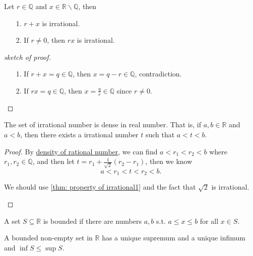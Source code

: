 \begin{theorem} \label{thm: property of irrational1}
    Let \(r \in \mathbb{Q} \) and \(x \in \mathbb{R} \backslash \mathbb{Q} \), then 
    \begin{itemize}
        \item [1.] \(r + x\) is irrational. 
        \item [2.] If \(r \neq 0\), then \(rx\) is irrational.   
    \end{itemize}  
\end{theorem}
\begin{proof}[sketch of proof]
    \vphantom{text}
    \begin{itemize}
        \item [1.] If \(r + x = q \in \mathbb{Q} \), then \(x = q - r \in \mathbb{Q} \), contradiction.  
        \item [2.] If \(rx = q \in \mathbb{Q} \), then \(x = \frac{q}{r} \in \mathbb{Q} \) since \(r \neq 0\).  
    \end{itemize}
\end{proof}

\begin{theorem}\label{thm: irrational dense in real}
    The set of irrational number is dense in real number. That is, if \(a, b \in \mathbb{R} \) and \(a < b\), then there exists a irrational number \(t\) such that \(a < t < b\).    
\end{theorem}
\begin{proof}
    By \hyperref[thm: rational dense in real]{density of rational number}, we can find \(a < r_1 < r_2 < b\) where \(r_1, r_2 \in \mathbb{Q} \), and then let \(t = r_1 + \frac{1}{\sqrt{2}}(r_2 - r_1)\), then we know
    \[
        a < r_1 < t < r_2 < b.
    \]    
    \begin{note}
        We should use \autoref{thm: property of irrational1} and the fact that \(\sqrt{2} \) is irrational. 
    \end{note}
\end{proof}

\begin{definition}\label{dfn: bounded set}
    A set \(S \subseteq \mathbb{R} \) is bounded if there are numbers \(a, b\) s.t. \(a \le x \le b\) for all \(x \in S\). 
\end{definition}

\begin{corollary}
    A bounded non-empty set in \(\mathbb{R} \) has a unique supremum and a unique infimum and \(\inf S \le \sup S\).    
\end{corollary}

